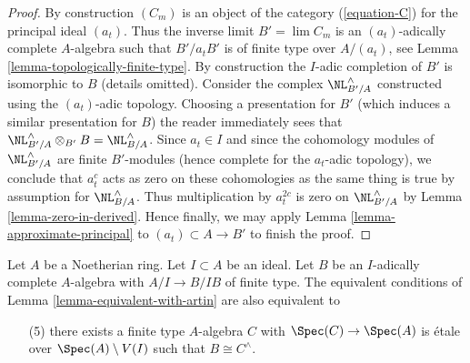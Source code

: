 \begin{proof}
\medskip\noindent
By construction $(C_m)$ is an object of the category
(\ref{equation-C}) for the principal ideal $(a_t)$.
Thus the inverse limit $B' = \lim C_m$ is an $(a_t)$-adically
complete $A$-algebra such that $B'/a_t B'$ is of finite type
over $A/(a_t)$, see Lemma \ref{lemma-topologically-finite-type}.
By construction the $I$-adic completion of $B'$ is isomorphic to $B$
(details omitted). Consider the complex $\NL_{B'/A}^\wedge$ constructed
using the $(a_t)$-adic topology. Choosing a presentation for $B'$
(which induces a similar presentation for $B$) the reader immediately
sees that $\NL_{B'/A}^\wedge \otimes_{B'} B = \NL_{B/A}^\wedge$.
Since $a_t \in I$ and since the cohomology modules of
$\NL_{B'/A}^\wedge$ are finite $B'$-modules (hence complete for the
$a_t$-adic topology), we conclude that $a_t^c$ acts as zero on
these cohomologies as the same thing is true by assumption for
$\NL_{B/A}^\wedge$. Thus multiplication by $a_t^{2c}$ is zero
on $\NL_{B'/A}^\wedge$ by Lemma \ref{lemma-zero-in-derived}.
Hence finally, we may apply Lemma \ref{lemma-approximate-principal}
to $(a_t) \subset A \to B'$ to finish the proof.
\end{proof}

\begin{lemma}
\label{lemma-approximate-by-etale-over-complement}
Let $A$ be a Noetherian ring. Let $I \subset A$ be an ideal.
Let $B$ be an $I$-adically complete $A$-algebra with $A/I \to B/IB$
of finite type. The equivalent conditions of
Lemma \ref{lemma-equivalent-with-artin} are also equivalent to
\begin{enumerate}
\item[(5)]
\label{item-algebraize}
there exists a finite type $A$-algebra $C$ with
$\Spec(C) \to \Spec(A)$ is \'etale over $\Spec(A) \setminus V(I)$
such that $B \cong C^\wedge$.
\end{enumerate}
\end{lemma}

